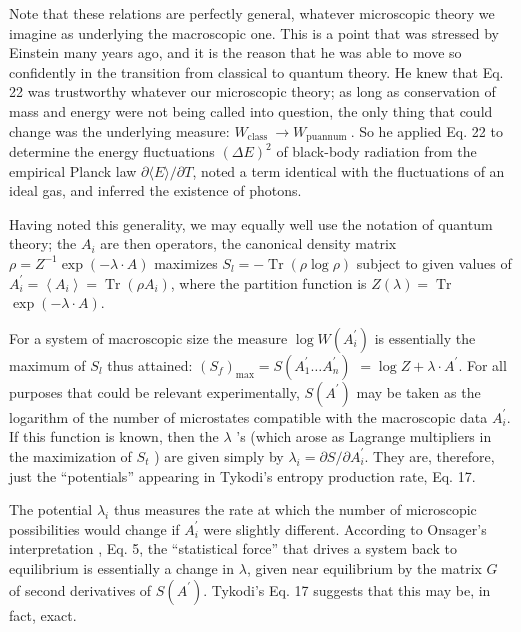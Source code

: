 \documentclass{article}
\begin{document}
Note that these relations are perfectly general, whatever microscopic theory we imagine as underlying the macroscopic one. This is a point that was stressed by Einstein many years ago, and it is the reason that he was able to move so confidently in the transition from classical to quantum theory. He knew that Eq. 22 was trustworthy whatever our microscopic theory; as long as conservation of mass and energy were not being called into question, the only thing that could change was the underlying measure: $W_{\text {class }} \rightarrow W_{\text {puannum }}$. So he applied Eq. 22 to determine the energy fluctuations $(\Delta E)^2$ of black-body radiation from the empirical Planck law $\partial\langle E\rangle / \partial T$, noted a term identical with the fluctuations of an ideal gas, and inferred the existence of photons.

Having noted this generality, we may equally well use the notation of quantum theory; the $A_i$ are then operators, the canonical density matrix $\rho=Z^{-1} \exp (-\lambda \cdot A)$ maximizes $S_l=-\operatorname{Tr}(\rho \log \rho)$ subject to given values of $A_i^{\prime}=\left\langle A_i\right\rangle=\operatorname{Tr}\left(\rho A_i\right)$, where the partition function is $Z(\lambda)=\operatorname{Tr}$ $\exp (-\lambda \cdot A)$.

For a system of macroscopic size the measure $\log W\left(A_i^{\prime}\right)$ is \cite{jaynes1965;19} essentially the maximum of $S_l$ thus attained: $\left(S_f\right)_{\max }=S\left(A_1^{\prime} \ldots A_n^{\prime}\right)$ $=\log Z+\lambda \cdot A^{\prime}$. For all purposes that could be relevant experimentally, $S\left(A^{\prime}\right)$ may be taken as the logarithm of the number of microstates compatible with the macroscopic data $A_i^{\prime}$. If this function is known, then the $\lambda$ 's (which arose as Lagrange multipliers in the maximization of $S_t$ ) are given simply by $\lambda_i=\partial S / \partial A_i^{\prime}$. They are, therefore, just the ``potentials'' appearing in Tykodi's entropy production rate, Eq. 17.

The potential $\lambda_i$ thus measures the rate at which the number of microscopic possibilities would change if $A_i^{\prime}$ were slightly different. According to Onsager's interpretation \cite{onsager1931}, Eq. 5, the ``statistical force'' that drives a system back to equilibrium is essentially a change in $\lambda$, given near equilibrium by the matrix $G$ of second derivatives of $S\left(A^{\prime}\right)$. Tykodi's Eq. 17 suggests that this may be, in fact, exact.
\end{document}
